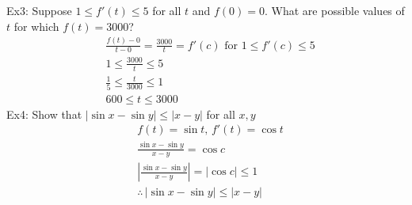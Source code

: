 Ex3: Suppose $1\leq f'(t)\leq 5$ for all $t$ and $f(0)=0$. What are possible values of $t$ for which $f(t)=3000$?
\begin{align*}
    &\frac{f(t)-0}{t-0}=\frac{3000}{t}=f'(c)\text{ for }1\leq f'(c)\leq 5\\
    &1\leq\frac{3000}{t}\leq 5\\
    &\frac{1}{5}\leq\frac{t}{3000}\leq 1\\
    &600\leq t\leq 3000
\end{align*}
Ex4: Show that $|\sin x-\sin y|\leq |x-y|$ for all $x,y$
\begin{align*}
    &f(t)=\sin t,\,f'(t)=\cos t\\
    &\frac{\sin x-\sin y}{x-y}=\cos c\\
    &\left|\frac{\sin x-\sin y}{x-y}\right|=|\cos c|\leq 1\\
    &\therefore\,|\sin x-\sin y|\leq |x-y|
\end{align*}

